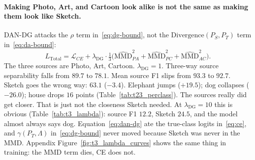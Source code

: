 \documentclass{article}
\begin{document}
\begin{table}[t]
  \centering
  \caption{Domain generalization on the same PACS split.
  Source separability is a $3$-way probe (chance $33\%$), not the Task~2 source-versus-Sketch probe.
  $\Delta_{\mathrm{sharp}}=L(\theta+\bar\epsilon)-L(\theta)$ at $\rho=0.05$.}
  \label{tab:t3_main}
  \small\setlength{\tabcolsep}{2.5pt}
  \resizebox{\linewidth}{!}{}
\end{table}

\paragraph{Making Photo, Art, and Cartoon look alike is not the same as making them look like Sketch.}
DAN-DG attacks the $\rho$ term in~\eqref{eq:dg-bound}, not the $\mathrm{Divergence}(P_S,P_T)$ term in~\eqref{eq:da-bound}:
\begin{equation}
  L_{\mathrm{Total}}
  =\mathcal{L}_{CE}
  +\lambda_{\mathrm{DG}}\cdot
  \tfrac13\big(\widehat{\mathrm{MMD}}^2_{PA}+\widehat{\mathrm{MMD}}^2_{PC}+\widehat{\mathrm{MMD}}^2_{AC}\big).
  \label{eq:dan-dg}
\end{equation}
The three sources are Photo, Art, Cartoon.
$\lambda_{\mathrm{DG}}=1$.
Three-way source separability falls from $89.7$ to $78.1$.
Mean source F1 slips from $93.3$ to $92.7$.
Sketch goes the wrong way: $63.1$ ($-3.4$).
Elephant jumps ($+19.5$); dog collapses ($-26.0$); house drops $16$ points (Table~\ref{tab:t23_perclass}).
The sources really did get closer. That is just not the closeness Sketch needed.
At $\lambda_{\mathrm{DG}}=10$ this is obvious (Table~\ref{tab:t3_lambda}): source F1 $12.2$, Sketch $24.5$, and the model almost always says dog.
Equation~\eqref{eq:dan-dg} ate the true-class logits in~\eqref{eq:ce}, and $\gamma(P_T,\Lambda)$ in~\eqref{eq:dg-bound} never moved because Sketch was never in the MMD.
Appendix Figure~\ref{fig:t3_lambda_curves} shows the same thing in training: the MMD term dies, CE does not.

\begin{table}[t]
  \centering
  \caption{DAN-DG alignment pressure, no Sketch in the batch.
  $\lambda_{\mathrm{DG}}=10$ is a collapsed source classifier, not a stronger invariant one.}
  \label{tab:t3_lambda}
  \small
  
\end{table}
\end{document}
